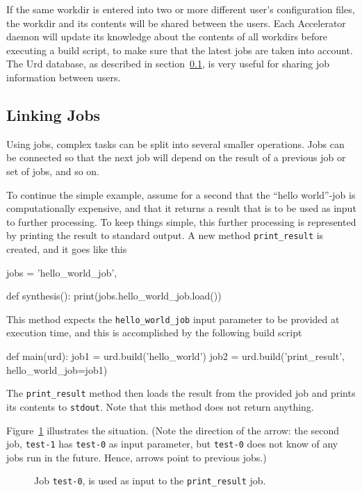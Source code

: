 If the same workdir is entered into two or more different user's
configuration files, the workdir and its contents will be shared
between the users.  Each Accelerator daemon will update its knowledge
about the contents of all workdirs before executing a build script, to
make sure that the latest jobs are taken into account.  The Urd
database, as described in section~\ref{}, is very useful for sharing
job information between users.


\subsection{Linking Jobs}

Using jobs, complex tasks can be split into several smaller
operations.  Jobs can be connected so that the next job will depend on
the result of a previous job or set of jobs, and so on.

To continue the simple example, assume for a second that the ``hello
world''-job is computationally expensive, and that it returns a result
that is to be used as input to further processing.  To keep things
simple, this further processing is represented by printing the result
to standard output.  A new method \texttt{print\_result} is created,
and it goes like this
\begin{python}
jobs = {'hello_world_job',}

def synthesis():
    print(jobs.hello_world_job.load())
\end{python}
This method expects the \texttt{hello\_world\_job} input parameter to
be provided at execution time, and this is accomplished by the
following build script
\begin{python}
def main(urd):
    job1 = urd.build('hello_world')
    job2 = urd.build('print_result', hello_world_job=job1)
\end{python}
The \texttt{print\_result} method then loads the result from the
provided job and prints its contents to \texttt{stdout}.  Note that
this method does not return anything.

Figure~\ref{fig:execflow-print-result} illustrates the situation.
(Note the direction of the arrow: the second job, \texttt{test-1} has
\texttt{test-0} as input parameter, but \texttt{test-0} does not know
of any jobs run in the future.  Hence, arrows point to previous jobs.)

\begin{figure}[h!]
  \begin{center}
    
    \caption{Job \texttt{test-0}, is used as input to the
      \texttt{print\_result} job.}
    \label{fig:execflow-print-result}
  \end{center}
\end{figure}


